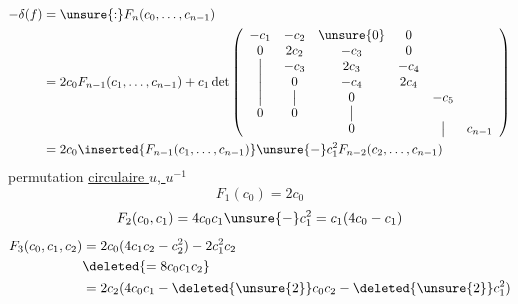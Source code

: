 \[
\begin{aligned}
-\delta(f)&=\unsure{\mathrel{:}}F_n(c_0,\ldots,c_{n-1})\\
&=2c_0F_{n-1}(c_1,\ldots,c_{n-1})
+c_1\det\left(
\begin{array}{cccccc}
-c_1&-c_2&\unsure{0}&0&&\\
0&2c_2&-c_3&0&&\\
\big|&-c_3&2c_3&-c_4&&\\
\big|&0&-c_4&2c_4&&\\
\big|&\big|&0&&-c_5&\\
0&0&\big|&&&\\
&&0&&\big|&c_{n-1}
\end{array}\right)\\
&=2c_0\inserted{F_{n-1}(c_1,\ldots,c_{n-1})}
\unsure{-}c_1^2F_{n-2}(c_2,\ldots,c_{n-1})
\end{aligned}
\]
permutation \uline{circulaire $u$, $u^{-1}$}
\[
F_1(c_0)=2c_0
\]
\[
F_2(c_0,c_1)=4c_0c_1\unsure{-}c_1^2
=c_1(4c_0-c_1)
\]
\[
\begin{aligned}
F_3(c_0,c_1,c_2)&=2c_0(4c_1c_2-c_2^2)-2c_1^2c_2\\
&\deleted{=8c_0c_1c_2}\\
&=2c_2(4c_0c_1-\deleted{\unsure{2}}c_0c_2-\deleted{\unsure{2}}c_1^2)
\end{aligned}
\]

